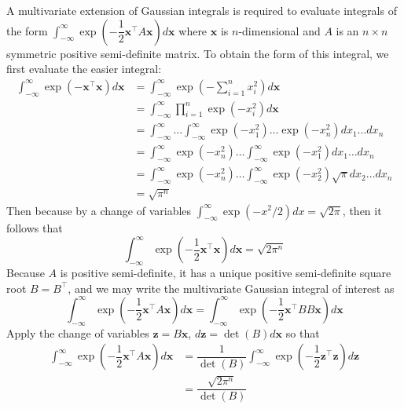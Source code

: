 \documentclass[11pt]{report} %
\begin{document}
A multivariate extension of Gaussian integrals is required to evaluate integrals of the form $\int_{-\infty}^{\infty}\exp\left(-\dfrac{1}{2}\mathbf{x}^{\top}A\mathbf{x}\right)d\mathbf{x}$ where $\mathbf{x}$ is $n$-dimensional and $A$ is an $n \times n$ symmetric positive semi-definite matrix. To obtain the form of this integral, we first evaluate the easier integral:
\begin{align}
\int_{-\infty}^{\infty}\exp\left(-\mathbf{x}^{\top}\mathbf{x}\right)d\mathbf{x} &= \int_{-\infty}^{\infty}\exp\left(-\sum_{i = 1}^{n}x_{i}^{2}\right)d\mathbf{x} \\
&= \int_{-\infty}^{\infty}\prod_{i = 1}^{n}\exp\left(-x_{i}^{2}\right)d\mathbf{x} \\
&= \int_{-\infty}^{\infty}\dots\int_{-\infty}^{\infty}\exp\left(-x_{1}^{2}\right)\dots\exp\left(-x_{n}^{2}\right)dx_{1}\dots dx_{n} \\
&= \int_{-\infty}^{\infty}\exp\left(-x_{n}^{2}\right)\dots\int_{-\infty}^{\infty}\exp\left(-x_{1}^{2}\right) dx_{1}\dots dx_{n} \\
&= \int_{-\infty}^{\infty}\exp\left(-x_{n}^{2}\right)\dots\int_{-\infty}^{\infty}\exp\left(-x_{2}^{2}\right)\sqrt{\pi} dx_{2}\dots dx_{n} \\
&= \sqrt{\pi^{n}}
\end{align}
Then because by a change of variables $\int_{-\infty}^{\infty}\exp\left(-x^{2}/2\right)dx = \sqrt{2\pi}$, then it follows that
\begin{equation}
\int_{-\infty}^{\infty}\exp\left(-\dfrac{1}{2}\mathbf{x}^{\top}\mathbf{x}\right)d\mathbf{x} = \sqrt{2\pi^{n}}
\end{equation}
Because $A$ is positive semi-definite, it has a unique positive semi-definite square root $B = B^{\top}$, and we may write the multivariate Gaussian integral of interest as
\begin{equation}
\int_{-\infty}^{\infty}\exp\left(-\dfrac{1}{2}\mathbf{x}^{\top}A\mathbf{x}\right)d\mathbf{x} = \int_{-\infty}^{\infty}\exp\left(-\dfrac{1}{2}\mathbf{x}^{\top}BB\mathbf{x}\right)d\mathbf{x}
\end{equation}
Apply the change of variables $\mathbf{z} = B\mathbf{x}$, $d\mathbf{z} = \det\left(B\right)d\mathbf{x}$ so that
\begin{align}
\int_{-\infty}^{\infty}\exp\left(-\dfrac{1}{2}\mathbf{x}^{\top}A\mathbf{x}\right)d\mathbf{x} &= \dfrac{1}{\det\left(B\right)}\int_{-\infty}^{\infty}\exp\left(-\dfrac{1}{2}\mathbf{z}^{\top}\mathbf{z}\right)d\mathbf{z} \\
&= \dfrac{\sqrt{2\pi^{n}}}{\det\left(B\right)}
\end{align}
\end{document}
